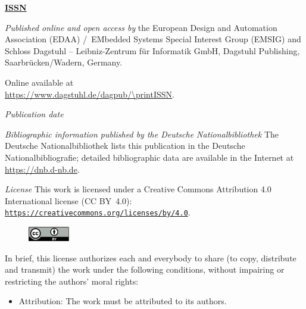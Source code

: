 \documentclass[a4paper,UKenglish]{litesmaster-v2021}
\begin{document}
\frontmatter

\maketitle

\begin{publicationinfo}%
\sffamily
\twocolumn

{\Large\bf\sffamily \textbf{\href{https://www.dagstuhl.de/lites}{ISSN \printISSN{}}}}

\bigskip

\emph{Published online and open access by}\newline
the European Design and Automation Association (EDAA) /\ EMbedded Systems Special Interest Group (EMSIG) and
Schloss Dagstuhl -- Leibniz-Zentrum f\"ur Informatik GmbH, Dagstuhl Publishing, Saarbr\"ucken/Wadern, Germany. 

Online available at \\ \url{https://www.dagstuhl.de/dagpub/\printISSN}.

\bigskip
\emph{Publication date}\newline
\printDatePublished{}



\bigskip

\emph{Bibliographic information published by the Deutsche Nationalbibliothek}\newline
The Deutsche Nationalbibliothek lists this publication in the Deutsche Nationalbibliografie; detailed bibliographic data are available in the Internet at \href{https://dnb.d-nb.de}{https://dnb.d-nb.de}. 

\bigskip

\emph{License}\newline
This work is licensed under a Creative Commons Attribution 4.0 International license (CC BY~4.0): \href{https://creativecommons.org/licenses/by/4.0/}{\nolinkurl{https://creativecommons.org/licenses/by/4.0}}.
\begin{figure}
\vspace*{-1\baselineskip}
\includegraphics[width=1.8cm]{cc-by}
\end{figure} 
In brief, this license authorizes each and everybody to share (to
copy, distribute and transmit) the work under the following
conditions, without impairing or restricting the authors'
moral rights:
\begin{itemize}
\item Attribution: The work must be attributed to its authors.
\end{itemize}


\end{publicationinfo}
\end{document}
